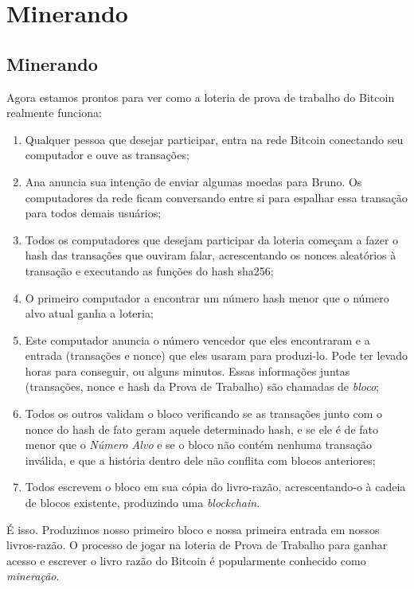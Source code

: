 \part{Minerando}
\label{ch:capitulo5}
\chapter*{Minerando}

Agora estamos prontos para ver como a loteria de prova de trabalho do Bitcoin realmente funciona:

\begin{enumerate}
\item Qualquer pessoa que desejar participar, entra na rede Bitcoin conectando seu computador e ouve as transações;
\item Ana anuncia sua intenção de enviar algumas moedas para Bruno. Os computadores da rede ficam conversando entre si para espalhar essa transação para todos demais usuários;
\item Todos os computadores que desejam participar da loteria começam a fazer o hash das transações que ouviram falar, acrescentando os nonces aleatórios à transação e executando as funções do hash sha256;
\item O primeiro computador a encontrar um número hash menor que o número alvo atual ganha a loteria;
\item Este computador anuncia o número vencedor que eles encontraram e a entrada (transações e nonce) que eles usaram para produzi-lo. Pode ter levado horas para conseguir, ou alguns minutos. Essas informações juntas (transações, nonce e hash da Prova de Trabalho) são chamadas de \textit{bloco};
\item Todos os outros validam o bloco verificando se as transações junto com o nonce do hash de fato geram aquele determinado hash, e se ele é de fato menor que o \textit{Número Alvo} e se o bloco não contém nenhuma transação inválida, e que a história dentro dele não conflita com blocos anteriores;
\item Todos escrevem o bloco em sua cópia do livro-razão, acrescentando-o à cadeia de blocos existente, produzindo uma \textit{blockchain}.
\end{enumerate}

É isso. Produzimos nosso primeiro bloco e nossa primeira entrada em nossos livros-razão. O processo de jogar na loteria de Prova de Trabalho para ganhar acesso e escrever o livro razão do Bitcoin é popularmente conhecido como \textit{mineração}.

